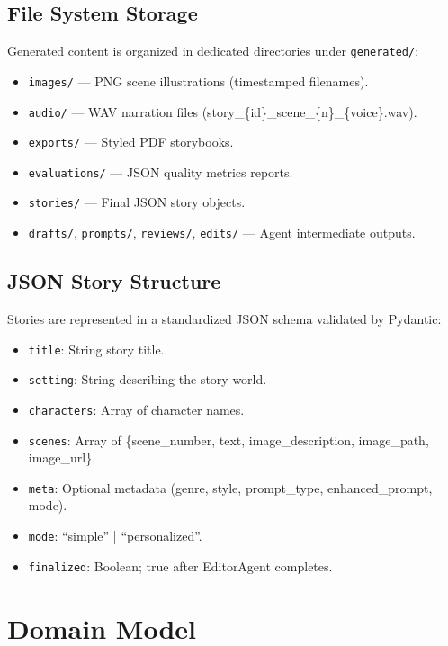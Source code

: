 \subsection{File System Storage}

Generated content is organized in dedicated directories under \texttt{generated/}:
\begin{itemize}
    \item \texttt{images/} — PNG scene illustrations (timestamped filenames).
    \item \texttt{audio/} — WAV narration files (story\_\{id\}\_scene\_\{n\}\_\{voice\}.wav).
    \item \texttt{exports/} — Styled PDF storybooks.
    \item \texttt{evaluations/} — JSON quality metrics reports.
    \item \texttt{stories/} — Final JSON story objects.
    \item \texttt{drafts/}, \texttt{prompts/}, \texttt{reviews/}, \texttt{edits/} — Agent intermediate outputs.
\end{itemize}

\subsection{JSON Story Structure}

Stories are represented in a standardized JSON schema validated by Pydantic:
\begin{itemize}
    \item \texttt{title}: String story title.
    \item \texttt{setting}: String describing the story world.
    \item \texttt{characters}: Array of character names.
    \item \texttt{scenes}: Array of \{scene\_number, text, image\_description, image\_path, image\_url\}.
    \item \texttt{meta}: Optional metadata (genre, style, prompt\_type, enhanced\_prompt, mode).
    \item \texttt{mode}: ``simple'' | ``personalized''.
    \item \texttt{finalized}: Boolean; true after EditorAgent completes.
\end{itemize}


\section{Domain Model}

